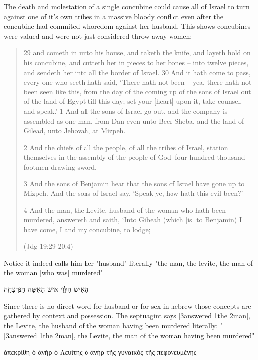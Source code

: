 \documentclass[11pt]{article}
\begin{document}
The death and molestation of a single concubine could cause all of Israel to turn against one of it's own tribes in a massive bloody conflict even after the concubine had commited whoredom against her husband. This shows concubines were valued and were not just considered throw away women:

\begin{quote}
29 and cometh in unto his house, and taketh the knife, and layeth hold on his concubine, and cutteth her in pieces to her bones -- into twelve pieces, and sendeth her into all the border of Israel.
30 And it hath come to pass, every one who seeth hath said, `There hath not been -- yea, there hath not been seen like this, from the day of the coming up of the sons of Israel out of the land of Egypt till this day; set your [heart] upon it, take counsel, and speak.'
1 And all the sons of Israel go out, and the company is assembled as one man, from Dan even unto Beer-Sheba, and the land of Gilead, unto Jehovah, at Mizpeh.

2 And the chiefs of all the people, of all the tribes of Israel, station themselves in the assembly of the people of God, four hundred thousand footmen drawing sword.

3 And the sons of Benjamin hear that the sons of Israel have gone up to Mizpeh. And the sons of Israel say, `Speak ye, how hath this evil been?'

4 And the man, the Levite, husband of the woman who hath been murdered, answereth and saith, `Into Gibeah (which [is] to Benjamin) I have come, I and my concubine, to lodge;

 (Jdg 19:29-20:4)
\end{quote}

Notice it indeed calls him her "husband" literally "the man, the levite, the man of the woman [who was] murdered"
\begin{hebrew}
הָאִישׁ הַלֵּוִי אִישׁ הָאִשָּׁה הַנִּרְצָחָ֖ה

\end{hebrew}
Since there is no direct word for husband or for sex in hebrew those concepts are gathered by context and possession. The septuagint says [3answered 1the 2man], the Levite, the husband of the woman having been murdered
literally: "[3answered 1the 2man], the Levite, the man of the woman having been murdered"

\begin{greek}
 ἀπεκρίθη ὁ ἀνὴρ ὁ Λευίτης ὁ ἀνὴρ τῆς γυναικὸς τῆς πεφονευμένης
\end{greek}
\end{document}
